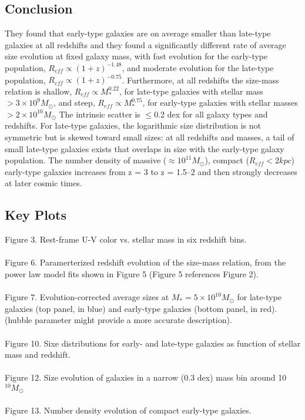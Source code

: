 \documentclass{article}
\begin{document}
\subsection{Conclusion}
They found that early-type galaxies are on average smaller than late-type galaxies at all
redshifts and they found a significantly different rate of average size evolution at 
fixed galaxy mass, with fast evolution for the early-type population, $R_{eff} \propto 
(1+z)^{-1.48}$, and moderate evolution for the late-type population, $R_{eff} \propto 
(1+z)^{-0.75}$. Furthermore, at all redshifts the size-mass relation is shallow, $R_{eff}
\propto M^{0.22}_{*}$, for late-type galaxies with stellar mass $> 3 \times 10^{9} 
M_{\odot}$, and steep, $R_{eff} \propto M^{0.75}_{*}$, for early-type galaxies with 
stellar masses $> 2 \times 10^{10} M_{\odot}$ The intrinsic scatter is $\leq$0.2 dex for 
all galaxy types and redshifts. For late-type galaxies, the logarithmic size distribution
is not symmetric but is skewed toward small sizes: at all redshifts and masses, a tail of
small late-type galaxies exists that overlaps in size with the early-type galaxy 
population. The number density of massive ($\approx10^{11} M_{\odot}$), compact ($R_{eff} < 2 
kpc$) early-type galaxies increases from z = 3 to z = 1.5–2 and then strongly decreases 
at later cosmic times. 

\subsection{Key Plots}
Figure 3. Rest-frame U-V color vs. stellar mass in six redshift bins.\\
\\
Figure 6. Paramerterized redshift evolution of the size-mass relation, from the power law model fits shown in Figure 5 (Figure 5 references Figure 2).\\
\\
Figure 7. Evolution-corrected average sizes at $M_{*} = 5 \times 10^{10} M_{\odot}$ for late-type galaxies (top panel, in blue) and early-type galaxies (bottom panel, in red). (hubble parameter might provide a more accurate description).\\
\\
Figure 10. Sixe distributions for early- and late-type galaxies as function of stellar mass and redshift.\\
\\
Figure 12. Size evolution of galaxies in a narrow (0.3 dex) mass bin around 10$^{10} M_{\odot}$ \\
\\
Figure 13. Number density evolution of compact early-type galaxies.\\
\end{document}

